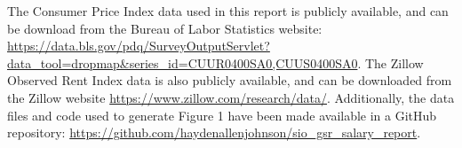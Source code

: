 \documentclass{article}
\begin{document}
The Consumer Price Index data used in this report is publicly available, and can be download from the Bureau of Labor Statistics website: \url{https://data.bls.gov/pdq/SurveyOutputServlet?data_tool=dropmap&series_id=CUUR0400SA0,CUUS0400SA0}. The Zillow Observed Rent Index data is also publicly available, and can be downloaded from the Zillow website \url{https://www.zillow.com/research/data/}. Additionally, the data files and code used to generate Figure 1 have been made available in a GitHub repository: \url{https://github.com/haydenallenjohnson/sio_gsr_salary_report}.



\end{document}
